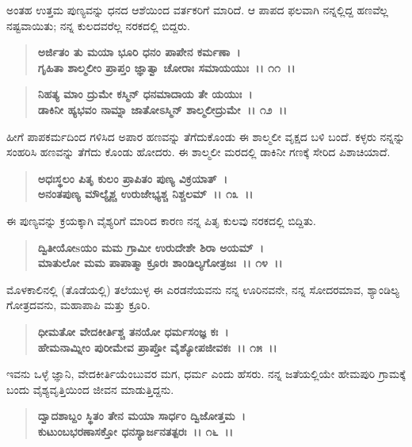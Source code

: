 ಅಂತಹ ಉತ್ತಮ ಪುಣ್ಯವನ್ನು ಧನದ ಆಶೆಯಿಂದ ವರ್ತಕರಿಗೆ ಮಾರಿದೆ. ಆ ಪಾಪದ ಫಲವಾಗಿ ನನ್ನಲ್ಲಿದ್ದ ಹಣವೆಲ್ಲ ನಷ್ಟವಾಯಿತು; ನನ್ನ ಕುಲದವರೆಲ್ಲ ನರಕದಲ್ಲಿ ಬಿದ್ದರು.

\begin{verse}
\textbf{ಅರ್ಜಿತಂ ತು ಮಯಾ ಭೂರಿ ಧನಂ ಪಾಪೇನ ಕರ್ಮಣಾ~।}\\\textbf{ಗೃಹಿತಾ ಶಾಲ್ಮಲೀಂ ಪ್ರಾಪ್ತಂ ಜ್ಞಾತ್ವಾ ಚೋರಾಃ ಸಮಾಯಯುಃ~।। ೧೧~।।}
\end{verse}

\begin{verse}
\textbf{ನಿಹತ್ಯ ಮಾಂ ದ್ರುಮೇ ಕಸ್ಮಿನ್ ಧನಮಾದಾಯ ತೇ ಯಯುಃ~।}\\\textbf{ಡಾಕಿನೀ ಹ್ಯಭವಂ ನಾಮ್ನಾ ಜಾತೋಽಸ್ಮಿನ್ ಶಾಲ್ಮಲೀದ್ರುಮೇ~।। ೧೨~।।}
\end{verse}

ಹೀಗೆ ಪಾಪಕರ್ಮದಿಂದ ಗಳಿಸಿದ ಅಪಾರ ಹಣವನ್ನು ತೆಗೆದುಕೊಂಡು ಈ ಶಾಲ್ಮಲೀ ವೃಕ್ಷದ ಬಳಿ ಬಂದೆ. ಕಳ್ಳರು ನನ್ನನ್ನು ಸಂಹರಿಸಿ ಹಣವನ್ನು ತೆಗೆದು ಕೊಂಡು ಹೋದರು. ಈ ಶಾಲ್ಮಲೀ ಮರದಲ್ಲಿ ಡಾಕಿನೀ ಗಣಕ್ಕೆ ಸೇರಿದ ಪಿಶಾಚಿಯಾದೆ.

\begin{verse}
\textbf{ಅಧಃಸ್ಥಲಂ ಪಿತೃ ಕುಲಂ ಪ್ರಾಪಿತಂ ಪುಣ್ಯ ವಿಕ್ರಯಾತ್~।}\\\textbf{ಅನಂತಪುಣ್ಯ ಮೌಲ್ಯೈಶ್ಚ ಉರುಜೇಭ್ಯಶ್ಚ ನಿಶ್ಚಲಮ್~।। ೧೩~।।}
\end{verse}

ಈ ಪುಣ್ಯವನ್ನು ಕ್ರಯಕ್ಕಾಗಿ ವೈಶ್ಯರಿಗೆ ಮಾರಿದ ಕಾರಣ ನನ್ನ ಪಿತೃ ಕುಲವು ನರಕದಲ್ಲಿ ಬಿದ್ದಿತು.

\begin{verse}
\textbf{ದ್ವಿತೀಯೋsಯಂ ಮಮ ಗ್ರಾಮೀ ಉರುದೇಶೇ ಶಿರಾ ಅಯಮ್~।}\\\textbf{ಮಾತುಲೋ ಮಮ ಪಾಪಾತ್ಮಾ ಕ್ರೂರಃ ಶಾಂಡಿಲ್ಯಗೋತ್ರಜಃ~।। ೧೪~।।}
\end{verse}

ಮೊಳಕಾಲಿನಲ್ಲಿ (ತೊಡೆಯಲ್ಲಿ) ತಲೆಯುಳ್ಳ ಈ ಎರಡನೆಯವನು ನನ್ನ ಊರಿನವನೇ, ನನ್ನ ಸೋದರಮಾವ, ಶ್ಯಾಂಡಿಲ್ಯ ಗೋತ್ರದವನು, ಮಹಾಪಾಪಿ ಮತ್ತು ಕ್ರೂರಿ.

\begin{verse}
\textbf{ಧೀಮತೋ ವೇದಕೀರ್ತಿಶ್ಚ ತನಯೋ ಧರ್ಮಸಂಜ್ಞ ಕಃ~।}\\\textbf{ಹೇಮನಾಮ್ನೀಂ ಪುರೀಮೇವ ಪ್ರಾಪ್ತೋ ವೈಶ್ಯೋಪಜೀವಕಃ~।। ೧೫~।।}
\end{verse}

ಇವನು ಒಳ್ಳೆ ಜ್ಞಾನಿ, ವೇದಕೀರ್ತಿಯೆಂಬುವರ ಮಗ, ಧರ್ಮ ಎಂದು ಹೆಸರು. ನನ್ನ ಜತೆಯಲ್ಲಿಯೇ ಹೇಮಪುರಿ ಗ್ರಾಮಕ್ಕೆ ಬಂದು ವೈಶ್ಯವೃತ್ತಿಯಿಂದ ಜೀವನ ಮಾಡುತ್ತಿದ್ದನು.

\begin{verse}
\textbf{ದ್ವಾದಶಾಬ್ದಂ ಸ್ಥಿತಂ ತೇನ ಮಯಾ ಸಾರ್ಧಂ ದ್ವಿಜೋತ್ತಮ~।}\\\textbf{ಕುಟುಂಬಭರಣಾಸಕ್ತೋ ಧನಸ್ಯಾರ್ಜನತತ್ಪರಃ~।। ೧೬~।।}
\end{verse}

